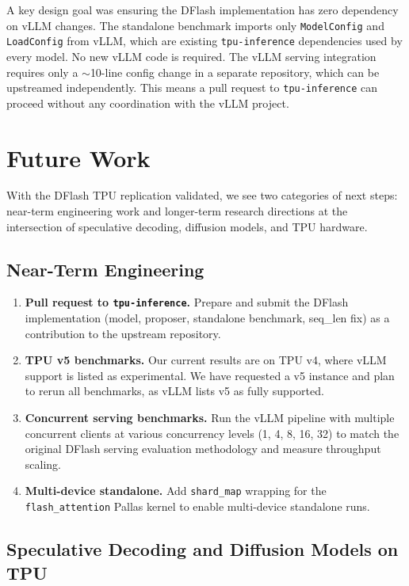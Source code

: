 \documentclass[12pt,letterpaper]{article}
\begin{document}
A key design goal was ensuring the DFlash implementation has zero dependency on vLLM changes. The standalone benchmark imports only \texttt{ModelConfig} and \texttt{LoadConfig} from vLLM, which are existing \texttt{tpu-inference} dependencies used by every model. No new vLLM code is required. The vLLM serving integration requires only a $\sim$10-line config change in a separate repository, which can be upstreamed independently. This means a pull request to \texttt{tpu-inference} can proceed without any coordination with the vLLM project.


\section{Future Work}

With the DFlash TPU replication validated, we see two categories of next steps: near-term engineering work and longer-term research directions at the intersection of speculative decoding, diffusion models, and TPU hardware.

\subsection{Near-Term Engineering}

\begin{enumerate}
    \item \textbf{Pull request to \texttt{tpu-inference}.} Prepare and submit the DFlash implementation (model, proposer, standalone benchmark, seq\_len fix) as a contribution to the upstream repository.
    \item \textbf{TPU v5 benchmarks.} Our current results are on TPU v4, where vLLM support is listed as experimental. We have requested a v5 instance and plan to rerun all benchmarks, as vLLM lists v5 as fully supported.
    \item \textbf{Concurrent serving benchmarks.} Run the vLLM pipeline with multiple concurrent clients at various concurrency levels (1, 4, 8, 16, 32) to match the original DFlash serving evaluation methodology and measure throughput scaling.
    \item \textbf{Multi-device standalone.} Add \texttt{shard\_map} wrapping for the \texttt{flash\_attention} Pallas kernel to enable multi-device standalone runs.
\end{enumerate}

\subsection{Speculative Decoding and Diffusion Models on TPU}
\end{document}
